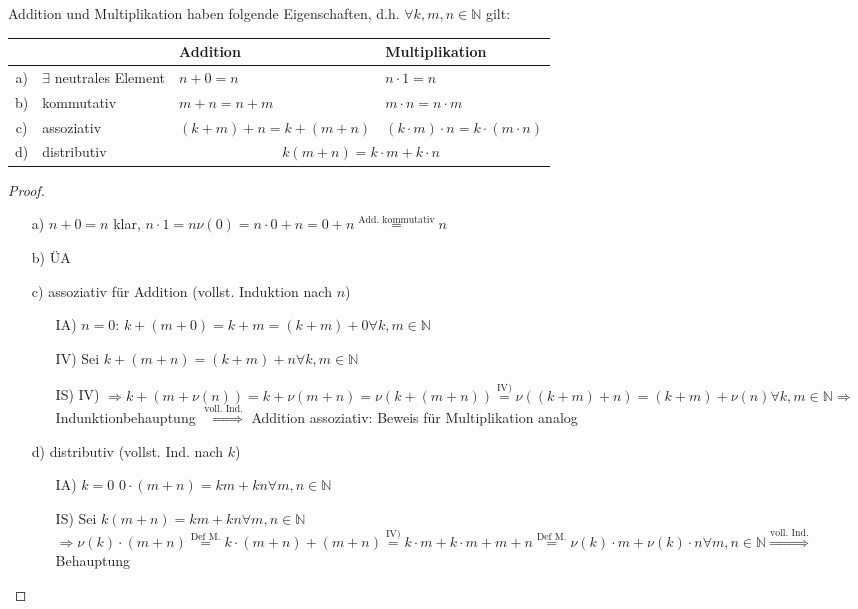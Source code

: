 \begin{proposition}
	Addition und Multiplikation haben folgende Eigenschaften, d.h. $\forall k,m,n\in\mathbb{N}$ gilt:
	
	\begin{tabular}{clll}
		\toprule
		&& Addition & Multiplikation\\
		\midrule
		a)& $\exists$ neutrales Element & $n+0=n$ & $n\cdot 1 =  n$\\
		b)& kommutativ & $m+n=n+m$ & $m\cdot n = n\cdot m$ \\
		c)& assoziativ & $(k+m)+n = k+(m+n)$ & $(k\cdot m)\cdot n = k\cdot (m\cdot n)$ \\
		d)&distributiv & \multicolumn{2}{c}{$k(m+n) = k\cdot m + k\cdot n$} \\
		\bottomrule
	\end{tabular}
\end{proposition}

\begin{proof}
	\begin{itemize}
		\item[a)] $n+0 = n$ klar, $n \cdot 1 = n\nu(0) = n \cdot 0 + n = 0 + n \overset{\text{Add. kommutativ}}{=} n$
		\item[b)] ÜA
		\item[c)] assoziativ für Addition (vollst. Induktion nach $n$)
		\begin{itemize}
			\item[IA)] $n=0$: $k+(m+0) = k + m = (k+m)+0 \forall k,m \in \mathbb{N}$
			\item[IV)] Sei $k+(m+n) = (k+m)+n \forall k,m \in \mathbb{N}$
			\item[IS)] 
				IV) $\Rightarrow k + (m + \nu(n)) = k+\nu(m+n) =\nu(k+(m+n)) \overset{\text{IV)}}{=} \nu((k+m)+n)
				=(k+m)+\nu(n) \forall k,m \in \mathbb{N}
				\Rightarrow$ Indunktionbehauptung
			$\overset{\text{voll. Ind.}}{\Rightarrow}$ Addition assoziativ: Beweis für Multiplikation analog
		\end{itemize}
		\item[d)] distributiv (vollst. Ind. nach $k$)
			\begin{itemize}
				\item[IA)] $k=0$ $0\cdot(m+n) = km + kn \forall m,n \in \mathbb{N}$
				\item[IS)] Sei $k(m+n) = km + kn \forall m,n \in \mathbb{N}$
				$\Rightarrow \nu(k)\cdot (m+n) \overset{\text{Def M.}}{=} k \cdot (m+n) + (m+n) \overset{\text{IV)}}{=}k\cdot m + k \cdot m + m+n \overset{\text{Def M.}}{=} \nu(k)\cdot m + \nu(k)\cdot n \forall m,n \in \mathbb{N} \overset{\text{voll. Ind.}}{\Rightarrow}$ Behauptung
			\end{itemize}
	\end{itemize}
\end{proof}

